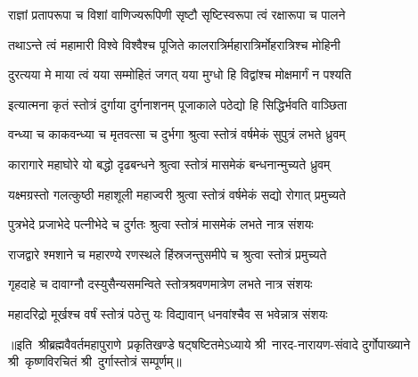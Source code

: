 \twolineshloka
{राज्ञां प्रतापरूपा च विशां वाणिज्यरूपिणी}
{सृष्टौ सृष्टिस्वरूपा त्वं रक्षारूपा च पालने}

\twolineshloka
{तथाऽन्ते त्वं महामारी विश्वे विश्वैश्च पूजिते}
{कालरात्रिर्महारात्रिर्मोहरात्रिश्च मोहिनी}

\twolineshloka
{दुरत्यया मे माया त्वं यया सम्मोहितं जगत्}
{यया मुग्धो हि विद्वांश्च मोक्षमार्गं न पश्यति}


\twolineshloka
{इत्यात्मना कृतं स्तोत्रं दुर्गाया दुर्गनाशनम्}
{पूजाकाले पठेद्यो हि सिद्धिर्भवति वाञ्छिता}

\twolineshloka
{वन्ध्या च काकवन्ध्या च मृतवत्सा च दुर्भगा}
{श्रुत्वा स्तोत्रं वर्षमेकं सुपुत्रं लभते ध्रुवम्}

\twolineshloka
{कारागारे महाघोरे यो बद्धो दृढबन्धने}
{श्रुत्वा स्तोत्रं मासमेकं बन्धनान्मुच्यते ध्रुवम्}

\twolineshloka
{यक्ष्मग्रस्तो गलत्कुष्ठी महाशूली महाज्वरी}
{श्रुत्वा स्तोत्रं वर्षमेकं सद्यो रोगात् प्रमुच्यते}

\twolineshloka
{पुत्रभेदे प्रजाभेदे पत्‍‌नीभेदे च दुर्गतः}
{श्रुत्वा स्तोत्रं मासमेकं लभते नात्र संशयः}

\twolineshloka
{राजद्वारे श्मशाने च महारण्ये रणस्थले}
{हिंस्रजन्तुसमीपे च श्रुत्वा स्तोत्रं प्रमुच्यते}

\twolineshloka
{गृहदाहे च दावाग्नौ दस्युसैन्यसमन्विते}
{स्तोत्रश्रवणमात्रेण लभते नात्र संशयः}

\twolineshloka
{महादरिद्रो मूर्खश्च वर्षं स्तोत्रं पठेत्तु यः}
{विद्यावान् धनवांश्चैव स भवेन्नात्र संशयः}

{॥इति~श्रीब्रह्मवैवर्तमहापुराणे~प्रकृतिखण्डे षट्षष्टितमेऽध्याये श्री~नारद-नारायण-संवादे दुर्गोपाख्याने श्री~कृष्णविरचितं श्री~दुर्गास्तोत्रं सम्पूर्णम्॥}